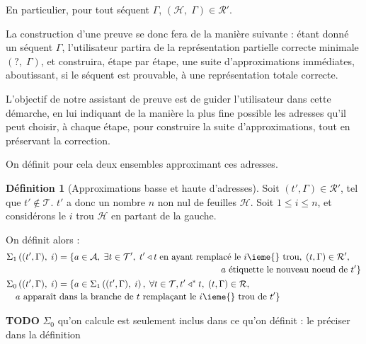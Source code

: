 \documentclass[11pt,a4paper]{article}
\theoremstyle{plain}
\theoremstyle{definition}
\newtheorem{definition}{Définition}
\theoremstyle{remark}
\newcommand*{\sequent}{\Gamma}
\newcommand*{\addresses}{\ensuremath{\mathcal{A}}}
\newcommand*{\trees}{\ensuremath{\mathcal{T}}}
\newcommand*{\treespartial}{\ensuremath{\mathcal{T'}}}
\newcommand*{\representations}{\ensuremath{\mathcal{R}}}
\newcommand*{\representationspartial}{\ensuremath{\mathcal{R'}}}
\newcommand*{\relapprox}{\ensuremath{\triangleleft}}
\newcommand*{\relapproxlarge}{\ensuremath{\relapprox^*}}
\newcommand*{\unknown}{\mathcal{H}}
\newcommand*{\lowapprox}{\ensuremath{\Sigma_0}}
\newcommand*{\highapprox}{\ensuremath{\Sigma_1}}
\newcommand*{\todo}{{\normalfont \textbf{TODO}} }
\begin{document}
En particulier, pour tout séquent $\sequent$, $(\unknown, \; \sequent) \in \representationspartial$.

La construction d'une preuve se donc fera de la manière suivante : étant donné un séquent $\sequent$, l'utilisateur partira de la représentation partielle correcte minimale $(?, \; \sequent)$, et construira, étape par étape, une suite d'approximations immédiates, aboutissant, si le séquent est prouvable, à une représentation totale correcte.

L'objectif de notre assistant de preuve est de guider l'utilisateur dans cette démarche, en lui indiquant de la manière la plus fine possible les adresses qu'il peut choisir, à chaque étape, pour construire la suite d'approximations, tout en préservant la correction.

On définit pour cela deux ensembles approximant ces adresses.

\begin{definition}[Approximations basse et haute d'adresses]
    Soit $(t', \sequent) \in \representationspartial$, tel que $t' \notin \trees$. $t'$ a donc un nombre $n$ non nul de feuilles $\unknown$. Soit $1 \leq i \leq n$, et considérons le $i$\ieme{} trou $\unknown$ en partant de la gauche.

    On définit alors :
    \begin{align*}
        & \begin{multlined}
            \highapprox \left( (t', \sequent), \; i \right) = \{ a \in \addresses, \; \exists t \in \treespartial, \; t' \relapprox t \; \text{en ayant remplacé le $i$\ieme{} trou}, \; (t, \sequent) \in \representationspartial, \; \\
            \text{$a$ étiquette le nouveau noeud de $t'$} \}
        \end{multlined}\\
        & \begin{multlined}
            \lowapprox \left( (t', \sequent), \; i \right) = \{ a \in \highapprox \left( (t', \sequent), \; i \right), \; \forall t \in \trees, t' \relapproxlarge t, \; (t, \sequent) \in \representations, \; \\
            \text{$a$ apparaît dans la branche de $t$ remplaçant le $i$\ieme{} trou de $t'$}
            \}
        \end{multlined}
    \end{align*} 
\end{definition}

\todo{$\lowapprox$ qu'on calcule est seulement inclus dans ce qu'on définit : le préciser dans la définition}
\end{document}
